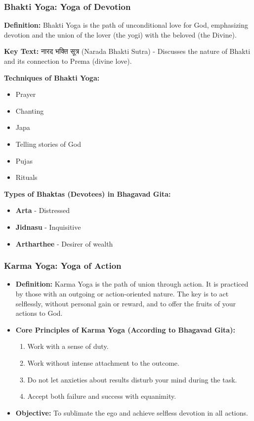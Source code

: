 \begin{frame}[fragile]\frametitle{Bhakti Yoga: Yoga of Devotion}
    \textbf{Definition:} Bhakti Yoga is the path of unconditional love for God, emphasizing devotion and the union of the lover (the yogi) with the beloved (the Divine).

    
    \textbf{Key Text:} नारद भक्ति सूत्र (Narada Bhakti Sutra) - Discusses the nature of Bhakti and its connection to Prema (divine love).

    
    \textbf{Techniques of Bhakti Yoga:}
    \begin{itemize}
        \item Prayer
        \item Chanting
        \item Japa
        \item Telling stories of God
        \item Pujas
        \item Rituals
    \end{itemize}

    
    \textbf{Types of Bhaktas (Devotees) in Bhagavad Gita:}
    \begin{itemize}
        \item \textbf{Arta} - Distressed
        \item \textbf{Jidnasu} - Inquisitive
        \item \textbf{Artharthee} - Desirer of wealth
    \end{itemize}
\end{frame}

\begin{frame}[fragile]\frametitle{Karma Yoga: Yoga of Action}
          \begin{itemize}
	  \item \textbf{Definition:} Karma Yoga is the path of union through action. It is practiced by those with an outgoing or action-oriented nature. The key is to act selflessly, without personal gain or reward, and to offer the fruits of your actions to God.

 
	  \item \textbf{Core Principles of Karma Yoga (According to Bhagavad Gita):}
    \begin{enumerate}
        \item Work with a sense of duty.
        \item Work without intense attachment to the outcome.
        \item Do not let anxieties about results disturb your mind during the task.
        \item Accept both failure and success with equanimity.
    \end{enumerate}

	  \item  \textbf{Objective:} To sublimate the ego and achieve selfless devotion in all actions.
	      \end{itemize}

\end{frame}

